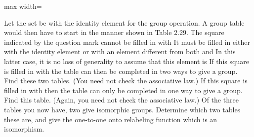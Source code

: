 \documentclass[11pt,oneside]{article}
\begin{document}
\begin{BookBody}

\begin{center}\begin{adjustbox}{max width=\linewidth}\end{adjustbox}\end{center}





Let the set be  with  the identity element for the group operation. A group table would then have to start in the manner shown in Table 2.29. The square indicated by the question mark cannot be filled in with  It must be filled in either with the identity element  or with an element different from both  and  In this latter case, it is no loss of generality to assume that this element is  If this square is filled in with  the table can then be completed in two ways to give a group. Find these two tables. (You need not check the associative law.) If this square is filled in with  then the table can only be completed in one way to give a group. Find this table. (Again, you need not check the associative law.) Of the three tables you now have, two give isomorphic groups. Determine which two tables these are, and give the one-to-one onto relabeling function which is an isomorphism.




\end{BookBody}
\end{document}
